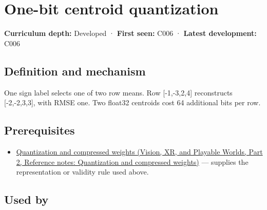 \hypertarget{appendix-4ccd7a775813}{}\label{referencestart:appendix-4ccd7a775813}
\section{One-bit centroid quantization}\label{appendix-4ccd7a775813-one-bit-centroid-quantization}

\hypertarget{appendix-4ccd7a775813-one-bit-centroid-quantization}{}

\textbf{Curriculum depth:} Developed · \textbf{First seen:} C006 · \textbf{Latest development:} C006

\begin{allmightroledefinition}

\subsection{Definition and mechanism}\label{appendix-4ccd7a775813-definition-and-mechanism}

\hypertarget{appendix-4ccd7a775813-definition-and-mechanism}{}

One sign label selects one of two row means. Row {[}-1,-3,2,4{]} reconstructs {[}-2,-2,3,3{]}, with RMSE one. Two float32 centroids cost 64 additional bits per row.

\end{allmightroledefinition}

\subsection{Prerequisites}\label{appendix-4ccd7a775813-prerequisites}

\hypertarget{appendix-4ccd7a775813-prerequisites}{}

\begin{itemize}
\tightlist
\item
  \href{../07-Vision-XR-and-Playable-Worlds-P02/main.pdf\#nameddest=appendix-fdc7879e8bf2}{Quantization and compressed weights (Vision, XR, and Playable Worlds, Part 2, Reference notes: Quantization and compressed weights)} --- supplies the representation or validity rule used above.
\end{itemize}

\subsection{Used by}\label{appendix-4ccd7a775813-used-by}

\hypertarget{appendix-4ccd7a775813-used-by}{}

